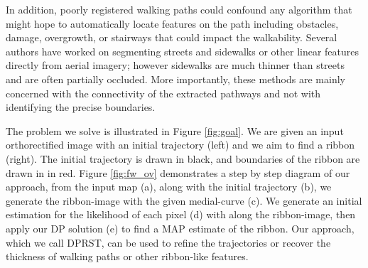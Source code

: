 
In addition, poorly registered walking paths could confound any algorithm that might hope to automatically locate
features on the path including obstacles, damage, overgrowth, or stairways that could impact the walkability. Several
authors\cite{femiani2009interval, femiani2007road} have worked on segmenting streets and sidewalks or other linear
features directly from aerial imagery; however sidewalks are much thinner than streets and are often partially occluded.
More importantly, these methods are mainly concerned with the connectivity of the extracted pathways and not with
identifying the precise boundaries. 

The problem we solve is illustrated in Figure \ref{fig:goal}.  We are given an input orthorectified image with an
initial trajectory (left) and we aim to find a ribbon (right). The initial trajectory is drawn in black, and boundaries 
of the ribbon are drawn in in red. 
Figure \ref{fig:fw_ov} demonstrates a step by step  diagram of our approach, 
from the input map (a), along with the initial
trajectory (b), we generate the ribbon-image with the given medial-curve (c).
We generate an initial estimation for the likelihood of each
pixel (d) with along the ribbon-image, then apply our \ac{DP} solution (e)
 to find a \ac{MAP} estimate of the ribbon.
Our approach, which we call \ac{DPRST}, can be used to refine the trajectories or recover the thickness of 
walking paths or other ribbon-like features. 
%

